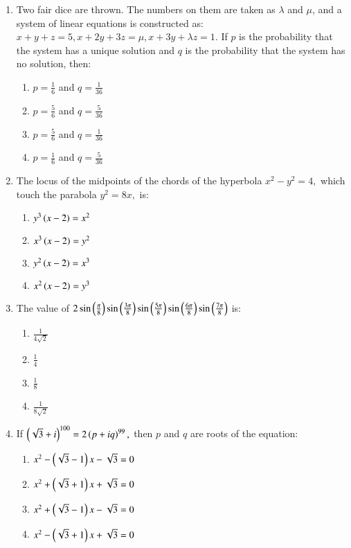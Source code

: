 \documentclass[journal,9pt,onecolumn]{IEEEtran}
\begin{document}
\begin{enumerate}
\item Two fair dice are thrown. The numbers on them are taken as $\lambda$ and $\mu$, and a system of linear equations is constructed as:
$
x + y + z = 5,
x + 2y + 3z = \mu,
x + 3y + \lambda z = 1.
$
If $p$ is the probability that the system has a unique solution and $q$ is the probability that the system has no solution, then:
\begin{multicols}{4}
\begin{enumerate}
    \item $p = \frac{1}{6}$ and $q = \frac{1}{36}$
    \item $p = \frac{5}{6}$ and $q = \frac{5}{36}$
    \item $p = \frac{5}{6}$ and $q = \frac{1}{36}$
    \item $p = \frac{1}{6}$ and $q = \frac{5}{36}$
\end{enumerate}
\end{multicols}


\item The locus of the midpoints of the chords of the hyperbola $x^2 - y^2 = 4,$ which touch the parabola $y^2 = 8x,$ is:
\begin{multicols}{4}    
\begin{enumerate}
    \item $y^3\left(x - 2\right) = x^2$
    \item $x^3\left(x - 2\right) = y^2 $
    \item $y^2\left(x - 2\right) = x^3$
    \item $x^2\left(x - 2\right) = y^3 $
\end{enumerate}
\end{multicols}


\item The value of $2\sin \left( \frac{\pi}{8} \right) \sin \left( \frac{3\pi}{8} \right) \sin \left( \frac{5\pi}{8}\right) \sin \left( \frac{6\pi}{8} \right) \sin \left( \frac{7\pi}{8}\right)$
is:
\begin{multicols}{4}
\begin{enumerate}
    \item $\frac{1}{4\sqrt{2}}$
    \item $\frac{1}{4}$
    \item $\frac{1}{8}$
    \item $\frac{1}{8\sqrt{2}}$
\end{enumerate}
\end{multicols}


\item If $ \left(\sqrt{3} + i\right)^{100} = 2 \left( p + iq\right)^{99},$ then $p$ and $q$ are roots of the equation:
\begin{multicols}{2}
\begin{enumerate}
    \item $ x^2 - \left(\sqrt{3} - 1\right)x - \sqrt{3} = 0$
    \item $ x^2 + \left(\sqrt{3} + 1\right)x + \sqrt{3} = 0$
    \item $ x^2 + \left(\sqrt{3} - 1\right)x - \sqrt{3} = 0$
    \item $ x^2 - \left(\sqrt{3} + 1\right)x + \sqrt{3} = 0$
\end{enumerate}
\end{multicols}



\end{enumerate}
\end{document}
